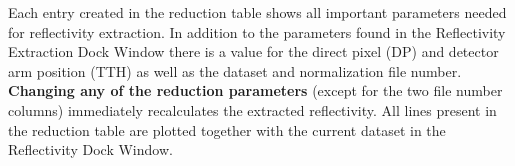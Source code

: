   Each entry created in the reduction table shows all important parameters needed for reflectivity extraction.
  In addition to the parameters found in the Reflectivity Extraction Dock Window there is a value for the direct pixel (DP) and detector arm position (TTH) as well as the dataset and normalization file number.
  \textbf{Changing any of the reduction parameters} (except for the two file number columns) immediately recalculates the extracted reflectivity.
  All lines present in the reduction table are plotted together with the current dataset in the Reflectivity Dock Window.

